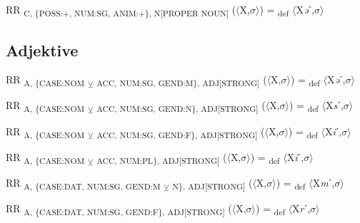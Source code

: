 {\begin{exe}
 RR \textsubscript{C, \{POSS:+, NUM:SG, ANIM:+\}, N[}\textsubscript{PROPER NOUN}\textsubscript{]} ($\langle$X,$\sigma $$\rangle$) = \textsubscript{def} $\langle$X\textit{ə}ˊ,$\sigma $$\rangle$
\end{exe}

\subsection{Adjektive}

\begin{exe}
 RR \textsubscript{A, \{CASE:NOM} \textsubscript{${\veebar}$}\textsubscript{ ACC, NUM:SG, GEND:M\}, ADJ[STRONG]} ($\langle$X,$\sigma $$\rangle$) = \textsubscript{def} $\langle$X\textit{ə}ˊ,$\sigma $$\rangle$
\end{exe}

\begin{exe}
 RR \textsubscript{A, \{CASE:NOM} \textsubscript{${\veebar}$}\textsubscript{ ACC, NUM:SG, GEND:N\}, ADJ[STRONG]} ($\langle$X,$\sigma $$\rangle$) = \textsubscript{def} $\langle$X\textit{s}ˊ,$\sigma $$\rangle$
\end{exe}

\begin{exe}
 RR \textsubscript{A, \{CASE:NOM} \textsubscript{${\veebar}$}\textsubscript{ ACC, NUM:SG, GEND:F\}, ADJ[STRONG]} ($\langle$X,$\sigma $$\rangle$) = \textsubscript{def} $\langle$X\textit{i}ˊ,$\sigma $$\rangle$
\end{exe}

\begin{exe}
 RR \textsubscript{A, \{CASE:NOM} \textsubscript{${\veebar}$}\textsubscript{ ACC, NUM:PL\}, ADJ[STRONG]} ($\langle$X,$\sigma $$\rangle$) = \textsubscript{def} $\langle$X\textit{i}ˊ,$\sigma $$\rangle$
\end{exe}

\begin{exe}
 RR \textsubscript{A, \{CASE:DAT, NUM:SG, GEND:M} \textsubscript{${\veebar}$}\textsubscript{ N\}, ADJ[STRONG]} ($\langle$X,$\sigma $$\rangle$) = \textsubscript{def} $\langle$X\textit{m}ˊ,$\sigma $$\rangle$
\end{exe}

\begin{exe}
 RR \textsubscript{A, \{CASE:DAT, NUM:SG, GEND:F\}, ADJ[STRONG]} ($\langle$X,$\sigma $$\rangle$) = \textsubscript{def} $\langle$X\textit{r}ˊ,$\sigma $$\rangle$
\end{exe}

}
